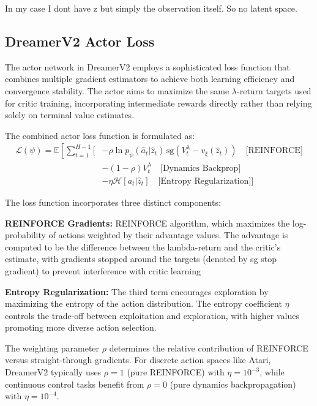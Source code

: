 \documentclass[
	english,
	ruledheaders=section,
	class=report,
	thesis={type=master},
	accentcolor=9c,
	custommargins=true,
	marginpar=false,
	parskip=half-,
	fontsize=11pt,
]{tudapub}
\begin{document}
In my case I dont have z but simply the observation itself. So no latent space.

\subsection{DreamerV2 Actor Loss}
\label{subsec:actor_loss}

The actor network in DreamerV2 employs a sophisticated loss function that combines multiple gradient estimators to achieve both learning efficiency and convergence stability. The actor aims to maximize the same $\lambda$-return targets used for critic training, incorporating intermediate rewards directly rather than relying solely on terminal value estimates.

The combined actor loss function is formulated as:
\begin{align}
	\mathcal{L}(\psi) = \mathbb{E}\left[\sum_{t=1}^{H-1} \Big[\right. & -\rho \ln p_\psi(\hat{a}_t | \hat{z}_t) \, \text{sg}(V^{\lambda}_t - v_\xi(\hat{z}_t)) \quad \text{[REINFORCE]} \\
	                                                                  & -(1-\rho)V^{\lambda}_t \quad \text{[Dynamics Backprop]}                                                         \\
	                                                                  & -\eta \mathcal{H}[a_t|\hat{z}_t] \quad \text{[Entropy Regularization]} \Big]
\end{align}

The loss function incorporates three distinct components:

\textbf{REINFORCE Gradients:}  REINFORCE algorithm, which maximizes the log-probability of actions weighted by their advantage values. The advantage is computed to be the difference between the lambda-return and the critic's estimate, with gradients stopped around the targets (denoted by sg stop gradient) to prevent interference with critic learning

\textbf{Entropy Regularization:} The third term encourages exploration by maximizing the entropy of the action distribution. The entropy coefficient $\eta$ controls the trade-off between exploitation and exploration, with higher values promoting more diverse action selection.

The weighting parameter $\rho$ determines the relative contribution of REINFORCE versus straight-through gradients. For discrete action spaces like Atari, DreamerV2 typically uses $\rho = 1$ (pure REINFORCE) with $\eta = 10^{-3}$, while continuous control tasks benefit from $\rho = 0$ (pure dynamics backpropagation) with $\eta = 10^{-4}$.
\end{document}
